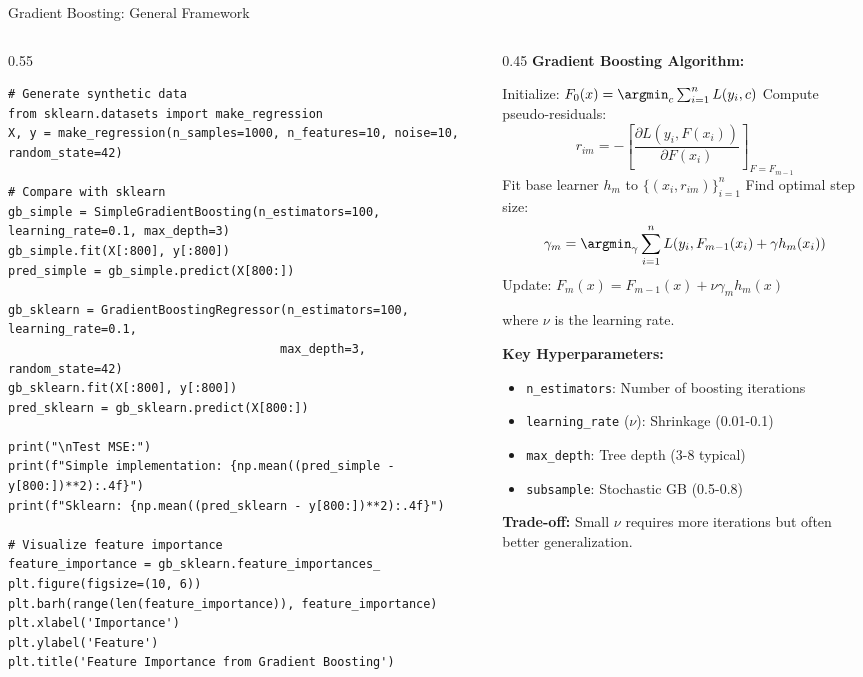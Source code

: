\begin{frame}[fragile]{Gradient Boosting: General Framework}
\begin{columns}
\begin{column}{0.55\textwidth}
\begin{lstlisting}[basicstyle=\ttfamily\tiny]
# Generate synthetic data
from sklearn.datasets import make_regression
X, y = make_regression(n_samples=1000, n_features=10, noise=10, random_state=42)

# Compare with sklearn
gb_simple = SimpleGradientBoosting(n_estimators=100, learning_rate=0.1, max_depth=3)
gb_simple.fit(X[:800], y[:800])
pred_simple = gb_simple.predict(X[800:])

gb_sklearn = GradientBoostingRegressor(n_estimators=100, learning_rate=0.1,
                                      max_depth=3, random_state=42)
gb_sklearn.fit(X[:800], y[:800])
pred_sklearn = gb_sklearn.predict(X[800:])

print("\nTest MSE:")
print(f"Simple implementation: {np.mean((pred_simple - y[800:])**2):.4f}")
print(f"Sklearn: {np.mean((pred_sklearn - y[800:])**2):.4f}")

# Visualize feature importance
feature_importance = gb_sklearn.feature_importances_
plt.figure(figsize=(10, 6))
plt.barh(range(len(feature_importance)), feature_importance)
plt.xlabel('Importance')
plt.ylabel('Feature')
plt.title('Feature Importance from Gradient Boosting')
\end{lstlisting}
\end{column}
\begin{column}{0.45\textwidth}
\textbf{Gradient Boosting Algorithm:}

\begin{algorithm}[H]
\caption{Gradient Boosting}
\begin{algorithmic}[1]
\STATE Initialize: $F_0(x) = \argmin_c \sum_{i=1}^n L(y_i, c)$
\STATE Compute pseudo-residuals:
\[r_{im} = -\left[\frac{\partial L(y_i, F(x_i))}{\partial F(x_i)}\right]_{F = F_{m-1}}\]
\STATE Fit base learner $h_m$ to $\{(x_i, r_{im})\}_{i=1}^n$
\STATE Find optimal step size:
\[\gamma_m = \argmin_\gamma \sum_{i=1}^n L(y_i, F_{m-1}(x_i) + \gamma h_m(x_i))\]
\STATE Update: $F_m(x) = F_{m-1}(x) + \nu \gamma_m h_m(x)$
\ENDFOR
\end{algorithmic}
\end{algorithm}

where $\nu$ is the learning rate.

\vspace{0.3cm}
\textbf{Key Hyperparameters:}
\begin{itemize}
\item \texttt{n\_estimators}: Number of boosting iterations
\item \texttt{learning\_rate} ($\nu$): Shrinkage (0.01-0.1)
\item \texttt{max\_depth}: Tree depth (3-8 typical)
\item \texttt{subsample}: Stochastic GB (0.5-0.8)
\end{itemize}

\textbf{Trade-off:}
Small $\nu$ requires more iterations but often better generalization.
\end{column}
\end{columns}
\end{frame}

